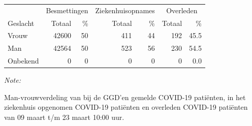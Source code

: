 \documentclass[
  english,
  man,floatsintext]{apa6}
\begin{document}
\begin{table}
\centering\begingroup\fontsize{11}{13}\selectfont

\begin{threeparttable}
\begin{tabular}{lrrrrrr}
\toprule
\multicolumn{1}{c}{ } & \multicolumn{2}{c}{Besmettingen} & \multicolumn{2}{c}{Ziekenhuisopnames} & \multicolumn{2}{c}{Overleden} \\
\cmidrule(l{3pt}r{3pt}){2-3} \cmidrule(l{3pt}r{3pt}){4-5} \cmidrule(l{3pt}r{3pt}){6-7}
Geslacht & Totaal & \% & Totaal & \% & Totaal & \%\\
\midrule
Vrouw & 42600 & 50 & 411 & 44 & 192 & 45.5\\
Man & 42564 & 50 & 523 & 56 & 230 & 54.5\\
Onbekend & 0 & 0 & 0 & 0 & 0 & 0.0\\
\bottomrule
\end{tabular}
\begin{tablenotes}
\item \textit{Note: } 
\item Man-vrouwverdeling van bij de GGD’en gemelde COVID-19 patiënten, in het ziekenhuis opgenomen COVID-19 patiënten en overleden COVID-19 patiënten van 09 maart t/m 23 maart 10:00 uur.
\end{tablenotes}
\end{threeparttable}
\endgroup{}
\end{table}
\newpage
\end{document}
